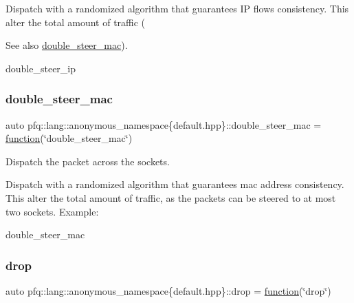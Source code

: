 Dispatch with a randomized algorithm that guarantees IP flows consistency. This alter the total amount of traffic (\begin{DoxySeeAlso}{See also}
\hyperlink{namespacepfq_1_1lang_1_1anonymous__namespace_02default_8hpp_03_a122b03580c609d71ca622ef9b15fa78d}{double\+\_\+steer\+\_\+mac}).
\end{DoxySeeAlso}
double\+\_\+steer\+\_\+ip \mbox{\label{namespacepfq_1_1lang_1_1anonymous__namespace_02default_8hpp_03_a122b03580c609d71ca622ef9b15fa78d}} 
\subsubsection{\texorpdfstring{double\+\_\+steer\+\_\+mac}{double\_steer\_mac}}
{\footnotesize\ttfamily auto pfq\+::lang\+::anonymous\+\_\+namespace\{default.\+hpp\}\+::double\+\_\+steer\+\_\+mac = \hyperlink{namespacepfq_1_1lang_a1a4638059d700ae08d0ca63886ff2bb3}{function}(\char`\"{}double\+\_\+steer\+\_\+mac\char`\"{})}



Dispatch the packet across the sockets. 

Dispatch with a randomized algorithm that guarantees mac address consistency. This alter the total amount of traffic, as the packets can be steered to at most two sockets. Example\+:

double\+\_\+steer\+\_\+mac \mbox{\label{namespacepfq_1_1lang_1_1anonymous__namespace_02default_8hpp_03_a0d715988e000ac6284a1615091eb4067}} 
\subsubsection{\texorpdfstring{drop}{drop}}
{\footnotesize\ttfamily auto pfq\+::lang\+::anonymous\+\_\+namespace\{default.\+hpp\}\+::drop = \hyperlink{namespacepfq_1_1lang_a1a4638059d700ae08d0ca63886ff2bb3}{function}(\char`\"{}drop\char`\"{})}



